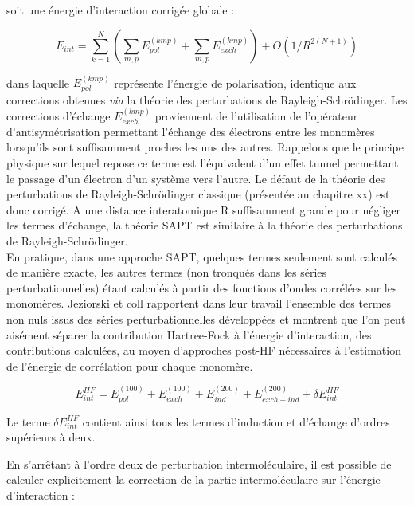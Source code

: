 \documentclass[12pt,a4paper]{book}
\begin{document}
	soit une énergie d’interaction corrigée globale :
	
	\begin{equation}
	E_{int} = \sum_{k=1}^{N} ( \sum_{m,p} E_{pol}^{(kmp)} + \sum_{m,p} E_{exch}^{(kmp)} ) + O(1/R^{2 (N+1)})
	\end{equation}
	
	\noindent dans laquelle $E_{pol}^{(kmp)}$ représente l'énergie de polarisation, identique aux corrections obtenues \textit{via} la théorie des perturbations de Rayleigh-Schr\"{o}dinger. Les corrections d'échange $E_{exch}^{(kmp)}$ proviennent de l'utilisation de l'opérateur d'antisymétrisation permettant l'échange des électrons entre les monomères lorsqu'ils sont suffisamment proches les uns des autres. Rappelons que le principe physique sur lequel repose ce terme est l'équivalent d'un effet tunnel permettant le passage d’un électron d’un système vers l’autre. Le défaut de la théorie des perturbations de Rayleigh-Schr\"{o}dinger classique (présentée au chapitre xx) est donc corrigé. A une distance interatomique R suffisamment grande pour négliger les termes d'échange, la théorie SAPT est similaire à la théorie des perturbations de Rayleigh-Schr\"{o}dinger.\\
	
	En pratique, dans une approche SAPT, quelques termes seulement sont calculés de manière exacte, les autres termes (non tronqués dans les séries perturbationnelles) étant calculés à partir des fonctions d’ondes corrélées sur les monomères. Jeziorski et coll rapportent dans leur travail l’ensemble des termes non nuls issus des séries perturbationnelles développées et montrent que l’on peut aisément séparer la contribution Hartree-Fock à l’énergie d’interaction, des contributions calculées, au moyen d’approches post-HF nécessaires à l’estimation de l’énergie de corrélation pour chaque monomère. 
	
	\begin{equation}
	E_{int}^{HF} =  E_{pol}^{(100)} + E_{exch}^{(100)} + E_{ind}^{(200)} + E_{exch-ind}^{(200)} + \delta E_{int}^{HF}
	\end{equation}
	
	Le terme $\delta E_{int}^{HF}$ contient ainsi tous les termes d'induction et d'échange d’ordres supérieurs à deux.
	
	En s’arrêtant à l’ordre deux de perturbation intermoléculaire, il est possible de calculer explicitement la correction de la partie intermoléculaire sur l’énergie d’interaction :
	
\end{document}
